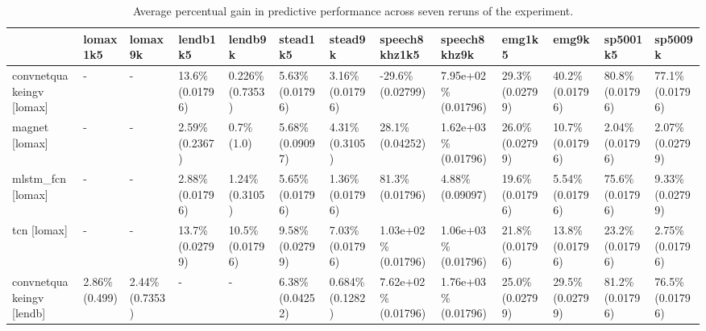 \begin{table}[]
\caption{Average percentual gain in predictive performance across seven reruns of the experiment.}
\begin{adjustwidth}{-1in}{-1in} %
\begin{tabular}{|l|l|l|l|l|l|l|l|l|l|l|l|l|}
\hline
  & \textbf{lomax1k5} & \textbf{lomax9k} & \textbf{lendb1k5} & \textbf{lendb9k} & \textbf{stead1k5} & \textbf{stead9k} & \textbf{speech8khz1k5} & \textbf{speech8khz9k} & \textbf{emg1k5} & \textbf{emg9k} & \textbf{sp5001k5} & \textbf{sp5009k}\\ \hline
convnetquakeingv [lomax] & - & - & \cellcolor{green} 13.6\% (0.01796) & 0.226\% (0.7353) & \cellcolor{green} 5.63\% (0.01796) & \cellcolor{green} 3.16\% (0.01796) & \cellcolor{red} -29.6\% (0.02799) & \cellcolor{green} 7.95e+02\% (0.01796) & \cellcolor{green} 29.3\% (0.02799) & \cellcolor{green} 40.2\% (0.01796) & \cellcolor{green} 80.8\% (0.01796) & \cellcolor{green} 77.1\% (0.01796) \\ \hline
magnet [lomax] & - & - & 2.59\% (0.2367) & 0.7\% (1.0) & 5.68\% (0.09097) & 4.31\% (0.3105) & \cellcolor{green} 28.1\% (0.04252) & \cellcolor{green} 1.62e+03\% (0.01796) & \cellcolor{green} 26.0\% (0.02799) & \cellcolor{green} 10.7\% (0.01796) & \cellcolor{green} 2.04\% (0.01796) & \cellcolor{green} 2.07\% (0.02799) \\ \hline
mlstm\_fcn [lomax] & - & - & \cellcolor{green} 2.88\% (0.01796) & 1.24\% (0.3105) & \cellcolor{green} 5.65\% (0.01796) & \cellcolor{green} 1.36\% (0.01796) & \cellcolor{green} 81.3\% (0.01796) & 4.88\% (0.09097) & \cellcolor{green} 19.6\% (0.01796) & \cellcolor{green} 5.54\% (0.01796) & \cellcolor{green} 75.6\% (0.01796) & \cellcolor{green} 9.33\% (0.02799) \\ \hline
tcn [lomax] & - & - & \cellcolor{green} 13.7\% (0.02799) & \cellcolor{green} 10.5\% (0.01796) & \cellcolor{green} 9.58\% (0.02799) & \cellcolor{green} 7.03\% (0.01796) & \cellcolor{green} 1.03e+02\% (0.01796) & \cellcolor{green} 1.06e+03\% (0.01796) & \cellcolor{green} 21.8\% (0.01796) & \cellcolor{green} 13.8\% (0.01796) & \cellcolor{green} 23.2\% (0.01796) & \cellcolor{green} 2.75\% (0.01796) \\ \hline
convnetquakeingv [lendb] & 2.86\% (0.499) & 2.44\% (0.7353) & - & - & \cellcolor{green} 6.38\% (0.04252) & 0.684\% (0.1282) & \cellcolor{green} 7.62e+02\% (0.01796) & \cellcolor{green} 1.76e+03\% (0.01796) & \cellcolor{green} 25.0\% (0.02799) & \cellcolor{green} 29.5\% (0.02799) & \cellcolor{green} 81.2\% (0.01796) & \cellcolor{green} 76.5\% (0.01796) \\ \hline

\end{tabular}
\end{adjustwidth}
\end{table}
